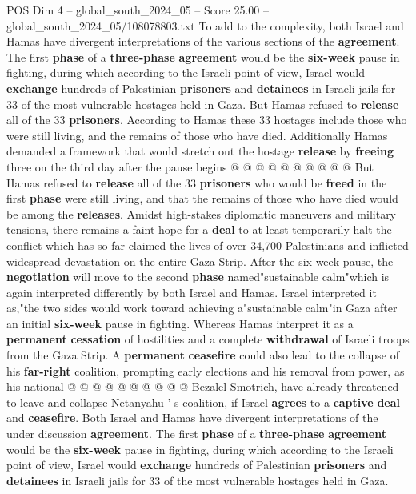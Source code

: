 \begin{textsample}{POS Dim 4 – global\_south\_2024\_05 – Score 25.00 – global\_south\_2024\_05/108078803.txt}
To add to the complexity, both Israel and Hamas have divergent interpretations of the various sections of the \textbf{agreement}.
The first \textbf{phase} of a \textbf{three-phase} \textbf{agreement} would be the \textbf{six-week} pause in fighting, during which according to the Israeli point of view, Israel would \textbf{exchange} hundreds of Palestinian \textbf{prisoners} and \textbf{detainees} in Israeli jails for 33 of the most vulnerable hostages held in Gaza.
But Hamas refused to \textbf{release} all of the 33 \textbf{prisoners}.
According to Hamas these 33 hostages include those who were still living, and the remains of those who have died.
Additionally Hamas demanded a framework that would stretch out the hostage \textbf{release} by \textbf{freeing} three on the third day after the pause begins @ @ @ @ @ @ @ @ @ @ But Hamas refused to \textbf{release} all of the 33 \textbf{prisoners} who would be \textbf{freed} in the first \textbf{phase} were still living, and that the remains of those who have died would be among the \textbf{releases}.
Amidst high-stakes diplomatic maneuvers and military tensions, there remains a faint hope for a \textbf{deal} to at least temporarily halt the conflict which has so far claimed the lives of over 34,700 Palestinians and inflicted widespread devastation on the entire Gaza Strip.
After the six week pause, the \textbf{negotiation} will move to the second \textbf{phase} named"sustainable calm"which is again interpreted differently by both Israel and Hamas.
Israel interpreted it as,"the two sides would work toward achieving a"sustainable calm"in Gaza after an initial \textbf{six-week} pause in fighting.
Whereas Hamas interpret it as a \textbf{permanent} \textbf{cessation} of hostilities and a complete \textbf{withdrawal} of Israeli troops from the Gaza Strip.
A \textbf{permanent} \textbf{ceasefire} could also lead to the collapse of his \textbf{far-right} coalition, prompting early elections and his removal from power, as his national @ @ @ @ @ @ @ @ @ @ Bezalel Smotrich, have already threatened to leave and collapse Netanyahu ' s coalition, if Israel \textbf{agrees} to a \textbf{captive} \textbf{deal} and \textbf{ceasefire}.
Both Israel and Hamas have divergent interpretations of the under discussion \textbf{agreement}.
The first \textbf{phase} of a \textbf{three-phase} \textbf{agreement} would be the \textbf{six-week} pause in fighting, during which according to the Israeli point of view, Israel would \textbf{exchange} hundreds of Palestinian \textbf{prisoners} and \textbf{detainees} in Israeli jails for 33 of the most vulnerable hostages held in Gaza.

\end{textsample}
